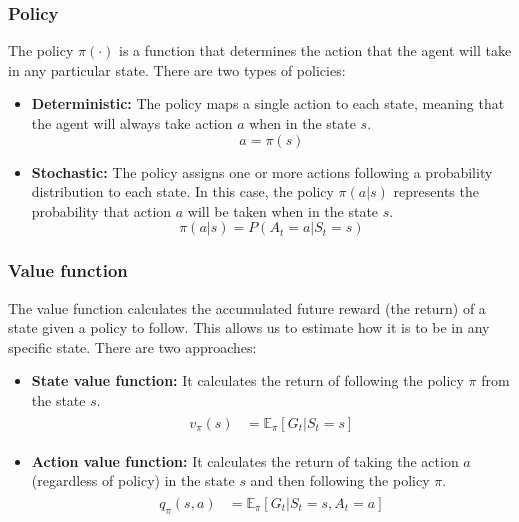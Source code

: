 \subsubsection*{Policy}

The policy $\pi(\cdot)$ is a function that determines the action that the agent will take in any particular state. There are two types of policies:

\begin{itemize}
    \item \textbf{Deterministic:} The policy maps a single action to each state, meaning that the agent will always take action $a$ when in the state $s$.
    \begin{equation}
        a = \pi(s)
    \end{equation}
    \item \textbf{Stochastic:} The policy assigns one or more actions following a probability distribution to each state. In this case, the policy $\pi(a|s)$ represents the probability that action $a$ will be taken when in the state $s$.
    \begin{equation}
        \pi(a|s) = P(A_t=a|S_t=s)
    \end{equation}
\end{itemize}

\subsubsection*{Value function}

The value function calculates the accumulated future reward (the return) of a state given a policy to follow. This allows us to estimate how  it is to be in any specific state. There are two approaches:

\begin{itemize}
    \item \textbf{State value function:} It calculates the return of following the policy $\pi$ from the state $s$.
    \begin{align}
    \begin{split}
        v_\pi(s) &= \mathbb{E}_\pi[G_t|S_t = s]%
    \end{split}
    \end{align}
    \item \textbf{Action value function:} It calculates the return of taking the action $a$ (regardless of policy) in the state $s$ and then following the policy $\pi$.
    \begin{align}
    \begin{split}
        q_\pi(s,a) &= \mathbb{E}_\pi[G_t |S_t = s,A_t = a]%
    \end{split}
    \end{align}
\end{itemize}

